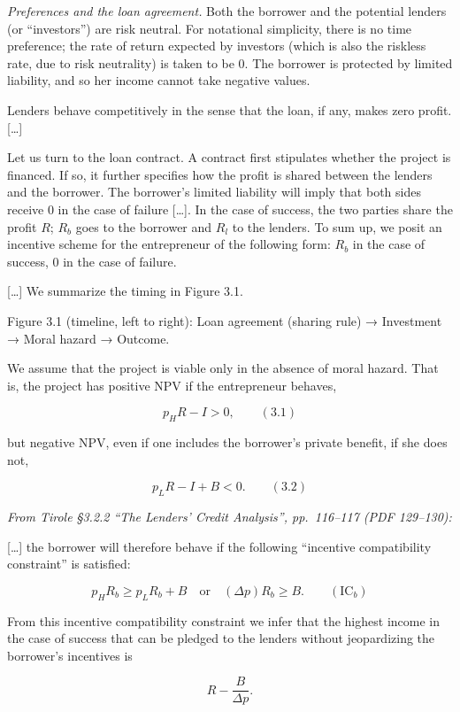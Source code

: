 \documentclass[11pt,a4paper]{article}
\begin{document}
\emph{Preferences and the loan agreement.} Both the borrower and the potential lenders (or
``investors'') are risk neutral. For notational simplicity, there is no time preference; the rate of
return expected by investors (which is also the riskless rate, due to risk neutrality) is taken to
be 0. The borrower is protected by limited liability, and so her income cannot take negative values.

Lenders behave competitively in the sense that the loan, if any, makes zero profit. {[}\ldots{]}

Let us turn to the loan contract. A contract first stipulates whether the project is financed. If
so, it further specifies how the profit is shared between the lenders and the borrower. The
borrower's limited liability will imply that both sides receive 0 in the case of failure
{[}\ldots{]}. In the case of success, the two parties share the profit \(R\); \(R_b\) goes to the
borrower and \(R_l\) to the lenders. To sum up, we posit an incentive scheme for the entrepreneur of
the following form: \(R_b\) in the case of success, 0 in the case of failure.

{[}\ldots{]} We summarize the timing in Figure 3.1.

Figure 3.1 (timeline, left to right): Loan agreement (sharing rule) → Investment → Moral hazard →
Outcome.

We assume that the project is viable only in the absence of moral hazard. That is, the project has
positive NPV if the entrepreneur behaves,

\[p_H R - I > 0, \qquad (3.1)\]

but negative NPV, even if one includes the borrower's private benefit, if she does not,

\[p_L R - I + B < 0. \qquad (3.2)\]

\emph{From Tirole §3.2.2 ``The Lenders' Credit Analysis'', pp.~116--117 (PDF 129--130):}

{[}\ldots{]} the borrower will therefore behave if the following ``incentive compatibility
constraint'' is satisfied:

\[p_H R_b \geqslant p_L R_b + B \quad \text{or} \quad (\Delta p) R_b \geqslant B. \qquad (\text{IC}_b)\]

From this incentive compatibility constraint we infer that the highest income in the case of success
that can be pledged to the lenders without jeopardizing the borrower's incentives is

\[R - \frac{B}{\Delta p}.\]
\end{document}
